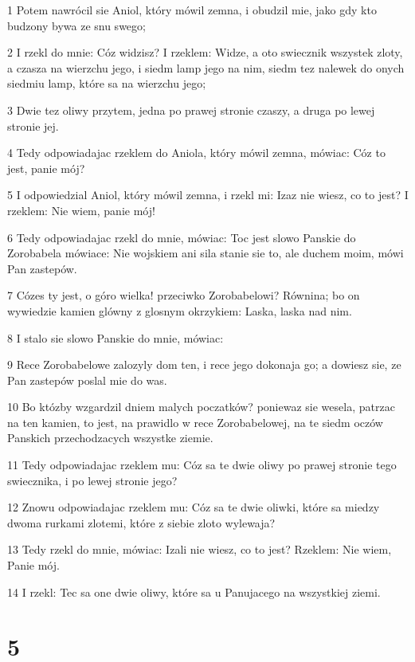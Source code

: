 \par 1 Potem nawrócil sie Aniol, który mówil zemna, i obudzil mie, jako gdy kto budzony bywa ze snu swego;
\par 2 I rzekl do mnie: Cóz widzisz? I rzeklem: Widze, a oto swiecznik wszystek zloty, a czasza na wierzchu jego, i siedm lamp jego na nim, siedm tez nalewek do onych siedmiu lamp, które sa na wierzchu jego;
\par 3 Dwie tez oliwy przytem, jedna po prawej stronie czaszy, a druga po lewej stronie jej.
\par 4 Tedy odpowiadajac rzeklem do Aniola, który mówil zemna, mówiac: Cóz to jest, panie mój?
\par 5 I odpowiedzial Aniol, który mówil zemna, i rzekl mi: Izaz nie wiesz, co to jest? I rzeklem: Nie wiem, panie mój!
\par 6 Tedy odpowiadajac rzekl do mnie, mówiac: Toc jest slowo Panskie do Zorobabela mówiace: Nie wojskiem ani sila stanie sie to, ale duchem moim, mówi Pan zastepów.
\par 7 Cózes ty jest, o góro wielka! przeciwko Zorobabelowi? Równina; bo on wywiedzie kamien glówny z glosnym okrzykiem: Laska, laska nad nim.
\par 8 I stalo sie slowo Panskie do mnie, mówiac:
\par 9 Rece Zorobabelowe zalozyly dom ten, i rece jego dokonaja go; a dowiesz sie, ze Pan zastepów poslal mie do was.
\par 10 Bo któzby wzgardzil dniem malych poczatków? poniewaz sie wesela, patrzac na ten kamien, to jest, na prawidlo w rece Zorobabelowej, na te siedm oczów Panskich przechodzacych wszystke ziemie.
\par 11 Tedy odpowiadajac rzeklem mu: Cóz sa te dwie oliwy po prawej stronie tego swiecznika, i po lewej stronie jego?
\par 12 Znowu odpowiadajac rzeklem mu: Cóz sa te dwie oliwki, które sa miedzy dwoma rurkami zlotemi, które z siebie zloto wylewaja?
\par 13 Tedy rzekl do mnie, mówiac: Izali nie wiesz, co to jest? Rzeklem: Nie wiem, Panie mój.
\par 14 I rzekl: Tec sa one dwie oliwy, które sa u Panujacego na wszystkiej ziemi.

\chapter{5}

